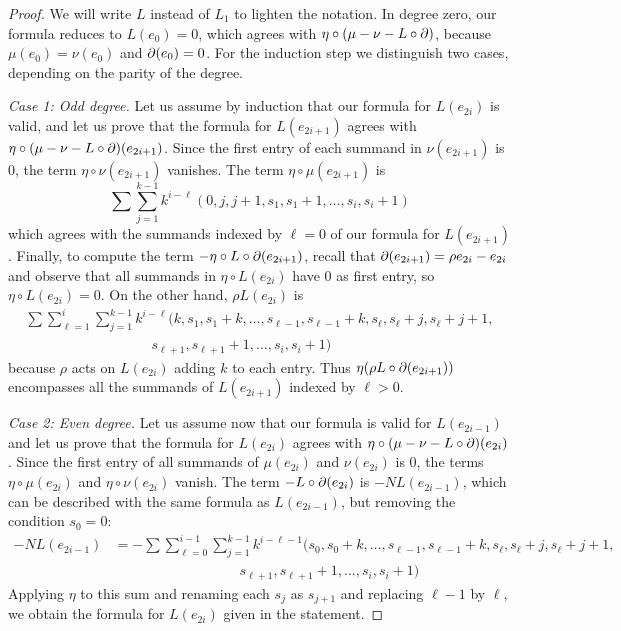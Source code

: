 \begin{proof}
    We will write $L$ instead of $L_1$ to lighten the notation. In degree zero, our formula reduces to $L(e_{0}) = 0$, which agrees with $\eta\circ (\mu - \nu - L\circ \operatorname{\partial})$, because $\mu(e_0) = \nu(e_0)$ and $\operatorname{\partial} (e_0) = 0$. For the induction step we distinguish two cases, depending on the parity of the degree.
    
    \medskip\noindent\emph{Case 1: Odd degree.} Let us assume by induction that our formula for $L(e_{2i})$ is valid, and let us prove that the formula for $L(e_{2i+1})$ agrees with $\eta\circ (\mu - \nu - L\circ \operatorname{\partial})(e_{2i+1})$. Since the first entry of each summand in $\nu(e_{2i+1})$ is $0$, the term $\eta\circ \nu(e_{2i+1})$ vanishes. The term $\eta\circ \mu(e_{2i+1})$ is
    \[
    \sum\sum_{j=1}^{k-1} k^{i-\ell}(0,j,j+1,s_1,s_1+1, \ldots,s_i,s_i+1)
    \]
    which agrees with the summands indexed by $\ell=0$ of our formula for $L(e_{2i+1})$. Finally, to compute the term $-\eta\circ L\circ \operatorname{\partial}(e_{2i+1})$, recall that $\operatorname{\partial} (e_{2i+1}) = \rho e_{2i} - e_{2i}$ and observe that all summands in $\eta\circ L(e_{2i})$ have $0$ as first entry, so $\eta\circ L(e_{2i}) = 0$. On the other hand, $\rho L(e_{2i})$ is 
    \begin{eqnarray*}
    \sum\sum_{\ell = 1}^i\sum_{j=1}^{k-1} k^{i-\ell} (k,s_1,s_1+k,\ldots,s_{\ell-1},s_{\ell-1}+k,s_{\ell},s_{\ell}+j,s_{\ell}+j+1,\\  \qquad\qquad\qquad \qquad \quad s_{\ell+1},s_{\ell+1}+1,\ldots,s_i,s_i+1)
    \end{eqnarray*}
    because $\rho$ acts on $L(e_{2i})$ adding $k$ to each entry. Thus $\eta(\rho L\circ \operatorname{\partial}(e_{2i+1}))$ encompasses all the summands of $L(e_{2i+1})$ indexed by $\ell>0$. 
    
    \medskip\noindent\emph{Case 2: Even degree.}
    Let us assume now that our formula is valid for $L(e_{2i-1})$ and let us prove that the formula for $L(e_{2i})$ agrees with $\eta\circ (\mu - \nu - L\circ \operatorname{\partial})(e_{2i})$. Since the first entry of all summands of $\mu(e_{2i})$ and $\nu(e_{2i})$ is $0$, the terms $\eta\circ \mu(e_{2i})$ and $\eta\circ \nu(e_{2i})$ vanish. The term $-L\circ \operatorname{\partial}(e_{2i})$ is $-N L(e_{2i-1})$, which can be described with the same formula as $L(e_{2i-1})$, but removing the condition $s_0 = 0$:
    \begin{align*}
        -N L(e_{2i-1}) &= -\sum\sum_{\ell = 0}^{i-1}\sum_{j=1}^{k-1} k^{i-\ell-1} (s_0,s_0+k,\ldots,s_{\ell-1},s_{\ell-1}+k,s_{\ell},s_{\ell}+j,s_{\ell}+j+1, \\ & \qquad\qquad\qquad \qquad \quad s_{\ell+1},s_{\ell+1}+1,\ldots,s_i,s_i+1)
    \end{align*}
    Applying $\eta$ to this sum and renaming each $s_j$ as $s_{j+1}$ and replacing $\ell-1$ by $\ell$, we obtain the formula for $L(e_{2i})$ given in the statement.  
 \end{proof}

